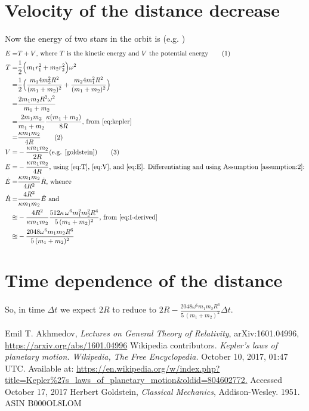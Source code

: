 \documentclass[]{article}
\newcommand\numberthis{\addtocounter{equation}{1}\tag{\theequation}}
\begin{document}
\section{Velocity of the distance decrease}
Now the energy of two stars in the orbit is (e.g. \cite{goldstein})
\begin{align*}
E=& T + V\text{, where $T$ is the kinetic energy and $V$ the potential energy} \numberthis \label{eq:E}\\
T=&\frac{1}{2}\Big(m_1r_1^2+m_2r_2^2\Big) \omega^2\\
=& \frac{1}{2}\Big(\frac{m_1 4m_2^2R^2}{(m_1+m_2)^2}+\frac{m_2 4m_1^2R^2}{(m_1+m_2)^2}\Big)\\
=&\frac{2 m_1 m_2 R^2 \omega^2}{m_1 + m_2}\\
=& \frac{2 m_1 m_2}{m_1 + m_2} \frac{\kappa (m_1 + m_2)}{8 R}\text{, from \eqref{eq:kepler}}\\
=& \frac{\kappa m_1 m_2}{4R} \numberthis \label{eq:T}\\
V=& - \frac{\kappa m_1 m_2}{2 R} \text{(e.g. \cite{goldstein})} \numberthis \label{eq:V}\\
E=&-\frac{\kappa m_1 m_2}{4R}\text{, using \eqref{eq:T}, \eqref{eq:V}, and \eqref{eq:E}. Differentiating and using Assumption \ref{assumption:2}:} \\
\dot{E} =& \frac{\kappa m_1 m_2}{4R^2}\dot{R}\text{, whence}\\
\dot{R}=& \frac{4 R^2}{\kappa m_1 m_2} \dot{E} \text{ and }\\
\approxeq& - \frac{4 R^2}{\kappa m_1 m_2} \frac{512\kappa\, \omega^6 m_1^2 m_2^2 R^4}{5\,(m_1 + m_2)^2} \text{, from \eqref{eq:I-derived}}\\
\approxeq& - \frac{2048 \omega^6 m_1 m_2 R^6}{5\,(m_1 + m_2)^2}
\end{align*}
\section{Time dependence of the distance}

So, in time $\Delta t$ we expect $2R$ to reduce to $2R-\frac{2048 \omega^6 m_1 m_2 R^6}{5\,(m_1 + m_2)^2} \Delta t$.

\begin{thebibliography}{9}
	Emil T. Akhmedov,
	\emph{Lectures on General Theory of Relativity},
 	arXiv:1601.04996,
 	\url{https://arxiv.org/abs/1601.04996}
 	Wikipedia contributors.
 	\emph{Kepler's laws of planetary motion. Wikipedia, The Free Encyclopedia.}  October 10, 2017, 01:47 UTC. Available at: 
 	\url{https://en.wikipedia.org/w/index.php?title=Kepler%27s_laws_of_planetary_motion&oldid=804602772.} Accessed
 	October 17, 2017
 	Herbert Goldstein,
 	\emph{Classical Mechanics},
 	 Addison-Wesley. 1951.
 	 ASIN B000OL8LOM
\end{thebibliography}
\end{document}
